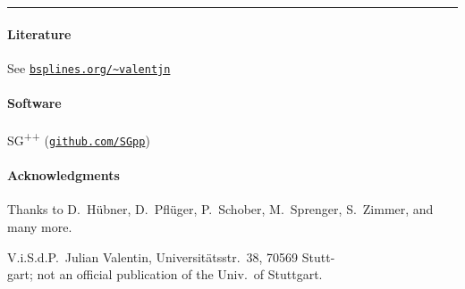 \documentclass[
  nofoldmark,
  portrait,
  12pt,
]{leaflet}
\begin{document}
  \vfill
  
  \hrule
  
  \paragraph{Literature}
  
  See \href{%
    https://bsplines.org/~valentjn%
  }{%
    \texttt{bsplines.org/\textasciitilde{}valentjn}%
  }
  
  \vspace{-1em}
  
  \paragraph{Software}
  
  SG\textsuperscript{++}
  (\href{https://github.com/SGpp}{\texttt{github.com/SGpp}})
  
  \vspace{-1em}
  
  \paragraph{Acknowledgments}
  
  Thanks to
  D.~Hübner,
  D.~Pflüger,
  P\hspace{-0.1em}.~Schober,
  M.~Sprenger,
  S.~Zimmer,
  and many more.
  
  \vspace{0.5em}
  
  {%
    \footnotesize
    V\hspace{-0.1em}.i.S.d.P\hspace{-0.1em}.\ Julian Valentin,
    Universitätsstr.\ 38, 70569 Stutt-\\gart;
    not an official publication of the Univ.\ of Stuttgart.%
  }
\end{document}
